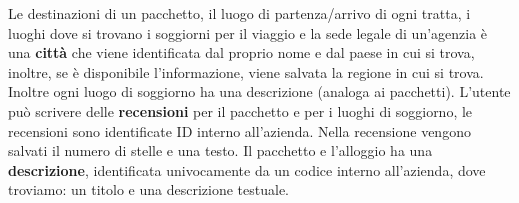 %
%
Le destinazioni di un pacchetto, il luogo di partenza/arrivo di ogni tratta, i luoghi dove si trovano i soggiorni per il viaggio e la sede legale di un'agenzia è una \textbf{città} che viene identificata dal proprio nome e dal paese in cui si trova, inoltre, se è disponibile l'informazione, viene salvata la regione in cui si trova. Inoltre ogni luogo di soggiorno ha una descrizione (analoga ai pacchetti). %
%
%
L'utente può scrivere delle \textbf{recensioni} per il pacchetto e per i luoghi di soggiorno, le recensioni sono identificate ID interno all'azienda. Nella recensione vengono salvati il numero di stelle e una testo.
%
%
Il pacchetto e l'alloggio ha una \textbf{descrizione}, identificata univocamente da un codice interno all'azienda, dove troviamo: un titolo e una descrizione testuale.
%

